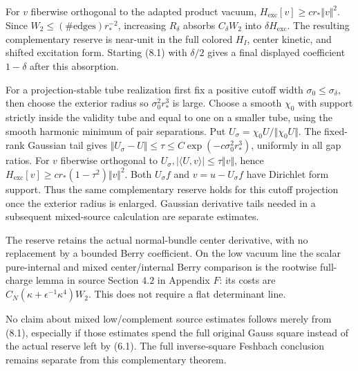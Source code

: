 For \(v\) fiberwise orthogonal to the adapted product vacuum,
\(H_{\mathrm{exc}}[v]\ge c r_{*}\Vert v\Vert ^{2}\). Since
\(W_{2}\le (\#\text{edges})r_{*}^{-2}\), increasing \(R_{\delta}\)
absorbs \(C_{\delta} W_{2}\) into \(\delta  H_{\mathrm{exc}}\). The
resulting complementary reserve is near-unit in the full colored
\(H_{I}\), center kinetic, and shifted excitation form. Starting (8.1)
with \(\delta  /2\) gives a final displayed coefficient \(1- \delta\)
after this absorption.

For a projection-stable tube realization first fix a positive cutoff
width \(\sigma _{0}\le  \sigma _{\delta}\), then choose the exterior
radius so \(\sigma _{0}^{2}r_{*}^{3}\) is large. Choose a smooth
\(\chi _{0}\) with support strictly inside the validity tube and equal
to one on a smaller tube, using the smooth harmonic minimum of pair
separations. Put \(U_{\sigma} = \chi _{0}U/\Vert  \chi _{0}U\Vert\). The
fixed-rank Gaussian tail gives
\(\Vert U_{\sigma} -U\Vert \le  \tau  \le C \exp (-c \sigma _{0}^{2}r_{*}^{3})\),
uniformly in all gap ratios. For \(v\) fiberwise orthogonal to
\(U_{\sigma} , \vert \langle U,v\rangle \vert \le  \tau  \Vert v\Vert\),
hence \(H_{\mathrm{exc}}[v]\ge cr_{*}(1- \tau ^{2})\Vert v\Vert ^{2}\).
Both \(U_{\sigma} f\) and \(v=u-U_{\sigma} f\) have Dirichlet form
support. Thus the same complementary reserve holds for this cutoff
projection once the exterior radius is enlarged. Gaussian derivative
tails needed in a subsequent mixed-source calculation are separate
estimates.

The reserve retains the actual normal-bundle center derivative, with no
replacement by a bounded Berry coefficient. On the low vacuum line the
scalar pure-internal and mixed center/internal Berry comparison is the
rootwise full-charge lemma in source Section \(4.2\) in Appendix \(F\):
its costs are \(C_{N}( \kappa  + \epsilon ^{-1} \kappa ^{4})W_{2}\).
This does not require a flat determinant line.

No claim about mixed low/complement source estimates follows merely from
(8.1), especially if those estimates spend the full original Gauss
square instead of the actual reserve left by (6.1). The full
inverse-square Feshbach conclusion remains separate from this
complementary theorem.
